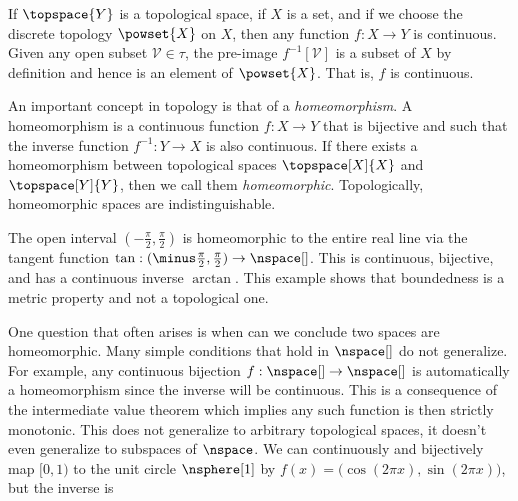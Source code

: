 \documentclass{book}                                                           %
\begin{document}
                \begin{example}
                    If $\topspace{Y}$ is a topological space, if $X$ is a set,
                    and if we choose the discrete topology $\powset{X}$ on $X$,
                    then any function $f:X\rightarrow{Y}$ is continuous. Given
                    any open subset $\mathcal{V}\in\tau$, the pre-image
                    $f^{\minus{1}}[\mathcal{V}]$ is a subset of $X$ by
                    definition and hence is an element of $\powset{X}$. That is,
                    $f$ is continuous.
                \end{example}
                An important concept in topology is that of a
                \textit{homeomorphism}. A homeomorphism is a continuous function
                $f:X\rightarrow{Y}$ that is bijective and such that the inverse
                function $f^{\minus{1}}:Y\rightarrow{X}$ is also continuous.
                If there exists a homeomorphism between topological spaces
                $\topspace[X]{X}$ and $\topspace[Y]{Y}$, then we call them
                \textit{homeomorphic}. Topologically, homeomorphic spaces are
                indistinguishable.
                \begin{example}
                    The open interval $(\minus\frac{\pi}{2},\frac{\pi}{2})$ is
                    homeomorphic to the entire real line via the tangent
                    function $\tan:(\minus\frac{\pi}{2},\frac{\pi}{2})%
                    \rightarrow\nspace[]$. This is continuous, bijective, and
                    has a continuous inverse $\arctan$. This example shows that
                    boundedness is a metric property and not a topological one.
                \end{example}
                One question that often arises is when can we conclude two
                spaces are homeomorphic. Many simple conditions that hold in
                $\nspace[]$ do not generalize. For example, any continuous
                bijection $f:\nspace[]\rightarrow\nspace[]$ is automatically a
                homeomorphism since the inverse will be continuous. This is a
                consequence of the intermediate value theorem which implies any
                such function is then strictly monotonic. This does not
                generalize to arbitrary topological spaces, it doesn't even
                generalize to subspaces of $\nspace$. We can continuously and
                bijectively map $[0,1)$ to the unit circle $\nsphere[1]$ by
                $f(x)=\big(\cos(2\pi{x}),\sin(2\pi{x})\big)$, but the inverse is
\end{document}
